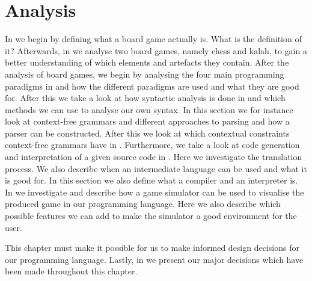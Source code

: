 \chapter{Analysis}
\label{chap:analysis}

In  we begin by defining what a board game
actually is. What is the definition of it? Afterwards, in
 we analyse two board games, namely chess and kalah,
to gain a better understanding of which elements and artefacts they contain.
After the analysis of board games, we begin by analysing the four main
programming paradigms in  and how the different paradigms
are used and what they are good for. After this we take a look at how syntactic
analysis is done in  and which methods we can use
to analyse our own syntax. In this section we for instance look at context-free
grammars and different approaches to parsing and how a parser can be
constructed. After this we look at which contextual constraints context-free
grammars have in . Furthermore, we take a look
at code generation and interpretation of a given source code in
. Here we investigate the
translation process. We also describe when an intermediate language can be used
and what it is good for. In this section we also define what a compiler and an
interpreter is. In  we investigate and describe how a game
simulator can be used to visualise the produced game in our programming
language. Here we also describe which possible features we can add to make the
simulator a good environment for the user. 

This chapter must make it possible for us to make informed design decisions for
our programming language. Lastly, in  we present
our major decisions which have been made throughout this chapter.











